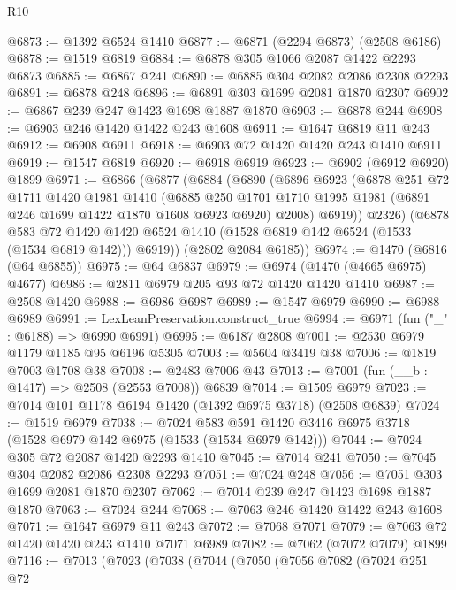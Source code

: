 \begin{lexlean}{R10}
\begin{coremodule}
@6873 := @1392 @6524 @1410
@6877 := @6871 (@2294 @6873) (@2508 @6186)
@6878 := @1519 @6819
@6884 := @6878 @305 @1066 @2087 @1422 @2293 @6873
@6885 := @6867 @241
@6890 := @6885 @304 @2082 @2086 @2308 @2293
@6891 := @6878 @248
@6896 := @6891 @303 @1699 @2081 @1870 @2307
@6902 := @6867 @239 @247 @1423 @1698 @1887 @1870
@6903 := @6878 @244
@6908 := @6903 @246 @1420 @1422 @243 @1608
@6911 := @1647 @6819 @11 @243
@6912 := @6908 @6911
@6918 := @6903 @72 @1420 @1420 @243 @1410 @6911
@6919 := @1547 @6819
@6920 := @6918 @6919
@6923 := @6902 (@6912 @6920) @1899
@6971 := @6866
    (@6877
      (@6884
        (@6890
          (@6896
            @6923
            (@6878
              @251
              @72
              @1711
              @1420
              @1981
              @1410
              (@6885
                @250
                @1701
                @1710
                @1995
                @1981
                (@6891 @246 @1699 @1422 @1870 @1608 @6923 @6920)
                @2008)
              @6919))
          @2326)
        (@6878
          @583
          @72
          @1420
          @1420
          @6524
          @1410
          (@1528 @6819 @142 @6524 (@1533 (@1534 @6819 @142)))
          @6919))
      (@2802 @2084 @6185))
@6974 := @1470 (@6816 (@64 @6855))
@6975 := @64 @6837
@6979 := @6974 (@1470 (@4665 @6975) @4677)
@6986 := @2811 @6979 @205 @93 @72 @1420 @1420 @1410
@6987 := @2508 @1420
@6988 := @6986 @6987
@6989 := @1547 @6979
@6990 := @6988 @6989
@6991 := LexLeanPreservation.construct_true
@6994 := @6971 (fun ("_" : @6188) => @6990 @6991)
@6995 := @6187 @2808
@7001 := @2530 @6979 @1179 @1185 @95 @6196 @5305
@7003 := @5604 @3419 @38
@7006 := @1819 @7003 @1708 @38
@7008 := @2483 @7006 @43
@7013 := @7001 (fun (__b : @1417) => @2508 (@2553 @7008)) @6839
@7014 := @1509 @6979
@7023 := @7014 @101 @1178 @6194 @1420 (@1392 @6975 @3718) (@2508 @6839)
@7024 := @1519 @6979
@7038 := @7024 @583 @591 @1420 @3416 @6975 @3718 (@1528 @6979 @142 @6975 (@1533 (@1534 @6979 @142)))
@7044 := @7024 @305 @72 @2087 @1420 @2293 @1410
@7045 := @7014 @241
@7050 := @7045 @304 @2082 @2086 @2308 @2293
@7051 := @7024 @248
@7056 := @7051 @303 @1699 @2081 @1870 @2307
@7062 := @7014 @239 @247 @1423 @1698 @1887 @1870
@7063 := @7024 @244
@7068 := @7063 @246 @1420 @1422 @243 @1608
@7071 := @1647 @6979 @11 @243
@7072 := @7068 @7071
@7079 := @7063 @72 @1420 @1420 @243 @1410 @7071 @6989
@7082 := @7062 (@7072 @7079) @1899
@7116 := @7013
    (@7023
      (@7038
        (@7044
          (@7050
            (@7056
              @7082
              (@7024
                @251
                @72

\end{coremodule}
\end{lexlean}
